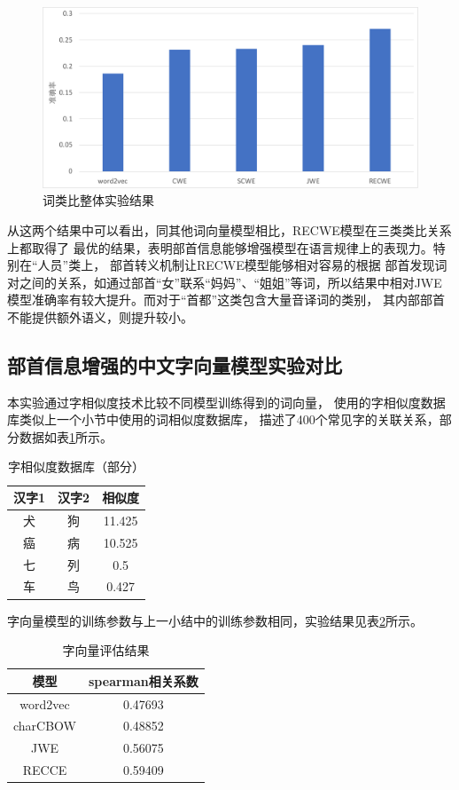 \begin{figure}
    \includegraphics[scale=0.5]{picture/word_analogy_result.pdf}
    \caption{词类比整体实验结果}
    \label{word_analogy_all_resutl}
\end{figure}

从这两个结果中可以看出，同其他词向量模型相比，RECWE模型在三类类比关系上都取得了
最优的结果，表明部首信息能够增强模型在语言规律上的表现力。特别在“人员”类上，
部首转义机制让RECWE模型能够相对容易的根据
部首发现词对之间的关系，如通过部首“女”联系“妈妈”、“姐姐”等词，所以结果中相对JWE模型准确率有较大提升。而对于“首都”这类包含大量音译词的类别，
其内部部首不能提供额外语义，则提升较小。

\subsection{部首信息增强的中文字向量模型实验对比}
本实验通过字相似度技术比较不同模型训练得到的词向量，
使用的字相似度数据库类似上一个小节中使用的词相似度数据库，
描述了400个常见字的关联关系，部分数据如表\ref{charsim_form}所示。
\begin{table}[h]
    \caption{字相似度数据库（部分）}
    \begin{tabular}{|c|c|c|}
        \hline
        汉字1 & 汉字2 & 相似度 \\
        \hline
        犬 & 狗 & 11.425 \\
        \hline
        癌 & 病 & 10.525 \\
        \hline
        七 & 列 & 0.5 \\
        \hline
        车 & 鸟 & 0.427 \\
        \hline
    \end{tabular}
    \label{charsim_form}
    \end{table}
字向量模型的训练参数与上一小结中的训练参数相同，实验结果见表\ref{char_vec_result}所示。
\begin{table}[ht]
    \caption{字向量评估结果}
    \begin{tabular}{|c|c|}
        \hline
        模型 &  spearman相关系数\\
        \hline
        word2vec & 0.47693 \\
        \hline
        charCBOW & 0.48852 \\
        \hline
        JWE & 0.56075 \\
        \hline
        RECCE & 0.59409 \\
        \hline
    \end{tabular}
    \label{char_vec_result}
    \end{table}

